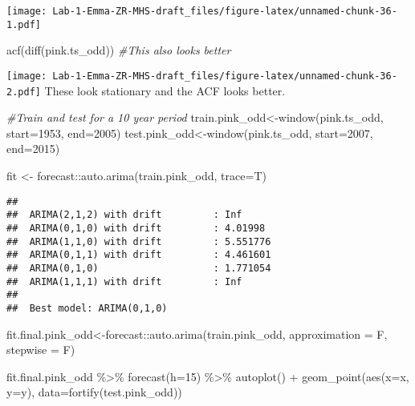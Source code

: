 \documentclass[
]{article}
\newenvironment{Shaded}{\begin{snugshade}}{\end{snugshade}}
\newcommand{\AttributeTok}[1]{\textcolor[rgb]{0.77,0.63,0.00}{#1}}
\newcommand{\CommentTok}[1]{\textcolor[rgb]{0.56,0.35,0.01}{\textit{#1}}}
\newcommand{\DecValTok}[1]{\textcolor[rgb]{0.00,0.00,0.81}{#1}}
\newcommand{\FunctionTok}[1]{\textcolor[rgb]{0.00,0.00,0.00}{#1}}
\newcommand{\NormalTok}[1]{#1}
\newcommand{\OtherTok}[1]{\textcolor[rgb]{0.56,0.35,0.01}{#1}}
\newcommand{\SpecialCharTok}[1]{\textcolor[rgb]{0.00,0.00,0.00}{#1}}
\begin{document}
\texttt{[image: Lab-1-Emma-ZR-MHS-draft\_files/figure-latex/unnamed-chunk-36-1.pdf]}

\begin{Shaded}
\begin{Highlighting}[]
\FunctionTok{acf}\NormalTok{(}\FunctionTok{diff}\NormalTok{(pink.ts\_odd)) }\CommentTok{\#This also looks better}
\end{Highlighting}
\end{Shaded}

\texttt{[image: Lab-1-Emma-ZR-MHS-draft\_files/figure-latex/unnamed-chunk-36-2.pdf]}
These look stationary and the ACF looks better.

\begin{Shaded}
\begin{Highlighting}[]
\CommentTok{\#Train and test for a 10 year period}
\NormalTok{train.pink\_odd}\OtherTok{\textless{}{-}}\FunctionTok{window}\NormalTok{(pink.ts\_odd, }\AttributeTok{start=}\DecValTok{1953}\NormalTok{, }\AttributeTok{end=}\DecValTok{2005}\NormalTok{)}
\NormalTok{test.pink\_odd}\OtherTok{\textless{}{-}}\FunctionTok{window}\NormalTok{(pink.ts\_odd, }\AttributeTok{start=}\DecValTok{2007}\NormalTok{, }\AttributeTok{end=}\DecValTok{2015}\NormalTok{)}

\NormalTok{fit }\OtherTok{\textless{}{-}}\NormalTok{ forecast}\SpecialCharTok{::}\FunctionTok{auto.arima}\NormalTok{(train.pink\_odd, }\AttributeTok{trace=}\NormalTok{T)}
\end{Highlighting}
\end{Shaded}

\begin{verbatim}
## 
##  ARIMA(2,1,2) with drift         : Inf
##  ARIMA(0,1,0) with drift         : 4.01998
##  ARIMA(1,1,0) with drift         : 5.551776
##  ARIMA(0,1,1) with drift         : 4.461601
##  ARIMA(0,1,0)                    : 1.771054
##  ARIMA(1,1,1) with drift         : Inf
## 
##  Best model: ARIMA(0,1,0)
\end{verbatim}

\begin{Shaded}
\begin{Highlighting}[]
\NormalTok{fit.final.pink\_odd}\OtherTok{\textless{}{-}}\NormalTok{forecast}\SpecialCharTok{::}\FunctionTok{auto.arima}\NormalTok{(train.pink\_odd, }\AttributeTok{approximation =}\NormalTok{ F, }\AttributeTok{stepwise =}\NormalTok{ F)}

\NormalTok{fit.final.pink\_odd }\SpecialCharTok{\%\textgreater{}\%}
  \FunctionTok{forecast}\NormalTok{(}\AttributeTok{h=}\DecValTok{15}\NormalTok{) }\SpecialCharTok{\%\textgreater{}\%}
  \FunctionTok{autoplot}\NormalTok{() }\SpecialCharTok{+} \FunctionTok{geom\_point}\NormalTok{(}\FunctionTok{aes}\NormalTok{(}\AttributeTok{x=}\NormalTok{x, }\AttributeTok{y=}\NormalTok{y), }\AttributeTok{data=}\FunctionTok{fortify}\NormalTok{(test.pink\_odd))}
\end{Highlighting}
\end{Shaded}
\end{document}
